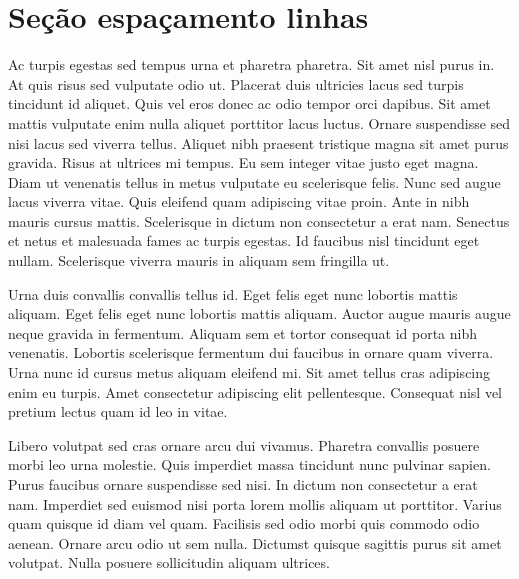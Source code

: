 \documentclass[12pt]{article}
\begin{document}
	\section{Seção espaçamento linhas}
		\doublespacing %
		Ac turpis egestas sed tempus urna et pharetra pharetra. Sit amet nisl purus in. At quis risus sed vulputate odio ut. Placerat duis ultricies lacus sed turpis tincidunt id aliquet. Quis vel eros donec ac odio tempor orci dapibus. Sit amet mattis vulputate enim nulla aliquet porttitor lacus luctus. Ornare suspendisse sed nisi lacus sed viverra tellus. Aliquet nibh praesent tristique magna sit amet purus gravida. Risus at ultrices mi tempus. Eu sem integer vitae justo eget magna. Diam ut venenatis tellus in metus vulputate eu scelerisque felis. Nunc sed augue lacus viverra vitae. Quis eleifend quam adipiscing vitae proin. Ante in nibh mauris cursus mattis. Scelerisque in dictum non consectetur a erat nam. Senectus et netus et malesuada fames ac turpis egestas. Id faucibus nisl tincidunt eget nullam. Scelerisque viverra mauris in aliquam sem fringilla ut.
		
		\begin{onehalfspace} %
			Urna duis convallis convallis tellus id. Eget felis eget nunc lobortis mattis aliquam. Eget felis eget nunc lobortis mattis aliquam. Auctor augue mauris augue neque gravida in fermentum. Aliquam sem et tortor consequat id porta nibh venenatis. Lobortis scelerisque fermentum dui faucibus in ornare quam viverra. Urna nunc id cursus metus aliquam eleifend mi. Sit amet tellus cras adipiscing enim eu turpis. Amet consectetur adipiscing elit pellentesque. Consequat nisl vel pretium lectus quam id leo in vitae.
		\end{onehalfspace}
	
		Libero volutpat sed cras ornare arcu dui vivamus. Pharetra convallis posuere morbi leo urna molestie. Quis imperdiet massa tincidunt nunc pulvinar sapien. Purus faucibus ornare suspendisse sed nisi. In dictum non consectetur a erat nam. Imperdiet sed euismod nisi porta lorem mollis aliquam ut porttitor. Varius quam quisque id diam vel quam. Facilisis sed odio morbi quis commodo odio aenean. Ornare arcu odio ut sem nulla. Dictumst quisque sagittis purus sit amet volutpat. Nulla posuere sollicitudin aliquam ultrices.
			
\end{document}
